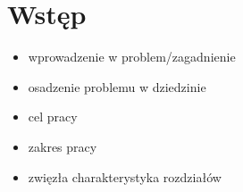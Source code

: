 \chapter{Wstęp}

\begin{itemize}
    \item wprowadzenie w problem/zagadnienie
    \item osadzenie problemu w dziedzinie
    \item cel pracy
    \item zakres pracy
    \item zwięzła charakterystyka rozdziałów
\end{itemize}
